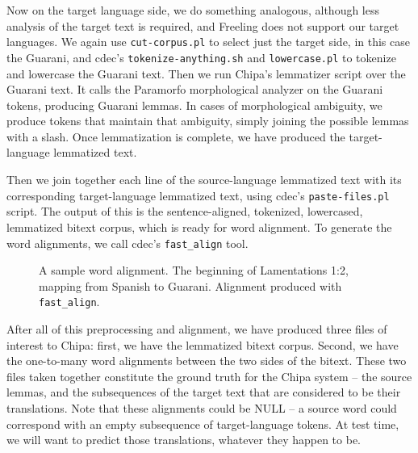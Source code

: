 Now on the target language side, we do something analogous, although less
analysis of the target text is required, and Freeling does not support our
target languages. We again use \texttt{cut-corpus.pl} to select just the target
side, in this case the Guarani, and cdec's \texttt{tokenize-anything.sh} and
\texttt{lowercase.pl} to tokenize and lowercase the Guarani text. Then we run
Chipa's lemmatizer script over the Guarani text. It calls the Paramorfo
morphological analyzer on the Guarani tokens, producing Guarani lemmas. In
cases of morphological ambiguity, we produce tokens that maintain that
ambiguity, simply joining the possible lemmas with a slash.  Once lemmatization
is complete, we have produced the target-language lemmatized text.

Then we join together each line of the source-language lemmatized text with its
corresponding target-language lemmatized text, using cdec's
\texttt{paste-files.pl} script. The output of this is the sentence-aligned,
tokenized, lowercased, lemmatized bitext corpus, which is ready for word
alignment. To generate the word alignments, we call cdec's \texttt{fast\_align}
tool.

\begin{figure*}
  \caption{A sample word alignment. The beginning of Lamentations 1:2, mapping
  from Spanish to Guarani. Alignment produced with \texttt{fast\_align}.}
  \label{fig:example-word-alignment}
\end{figure*}

After all of this preprocessing and alignment, we have produced three files of
interest to Chipa: first, we have the lemmatized bitext corpus. Second, we have
the one-to-many word alignments between the two sides of the bitext. These two
files taken together constitute the ground truth for the Chipa system -- the
source lemmas, and the subsequences of the target text that are considered to
be their translations. Note that these alignments could be NULL -- a source
word could correspond with an empty subsequence of target-language tokens. At
test time, we will want to predict those translations, whatever they happen to
be.

